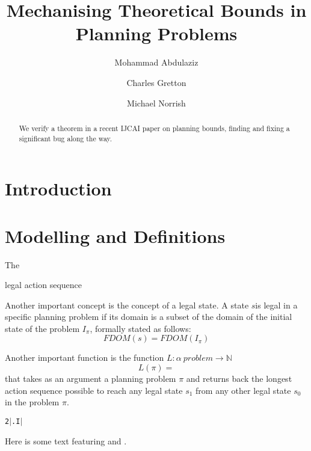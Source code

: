 \documentclass{llncs}
\title{Mechanising Theoretical Bounds in Planning Problems}
\author{Mohammad Abdulaziz \and Charles Gretton \and Michael Norrish}
\institute{Canberra Research Lab., NICTA}
\begin{document}
\maketitle

\begin{abstract}
We verify a theorem in a recent IJCAI paper on planning bounds, finding and fixing a significant bug along the way.
\end{abstract}

\section{Introduction}
\label{sec:introduction}

\section{Modelling and Definitions}
\label{sec:modelling}

The

legal action sequence


Another important concept is the concept of a legal state. A state \(s\)is legal in a specific planning problem if its domain is a subset
 of the domain of the initial state of the problem \(I_\pi\), formally stated as follows:
\begin{equation}
\label{eqn:legalstate}
FDOM (s) = FDOM (I_\pi)
\end{equation}


Another important function is the function \begin{math} L :\alpha \ problem \rightarrow \mathbb{N} \end{math}
\begin{equation}
\label{eqn:L}
L(\pi) =
\end{equation}
that takes as an argument a planning problem \( \pi \) and returns back the longest action sequence possible to
 reach any legal state \(s_1\) from any other legal state \(s_0\) in the
problem \(\pi\).

\begin{alltt}
\HOLTokenTurnstile{}  \HOLFreeVar{\ensuremath{\Pi}} \HOLTokenImp{} \HOLConst{\ensuremath{\ell}} \HOLFreeVar{\ensuremath{\Pi}} \HOLTokenLeq{} 2 \HOLTokenExp{} \ensuremath{|} \HOLFreeVar{\ensuremath{\Pi}}.I\ensuremath{|}
\end{alltt}

Here is some text featuring  and \HOLinline{\HOLConst{\ensuremath{\ell}}}.
\end{document}
